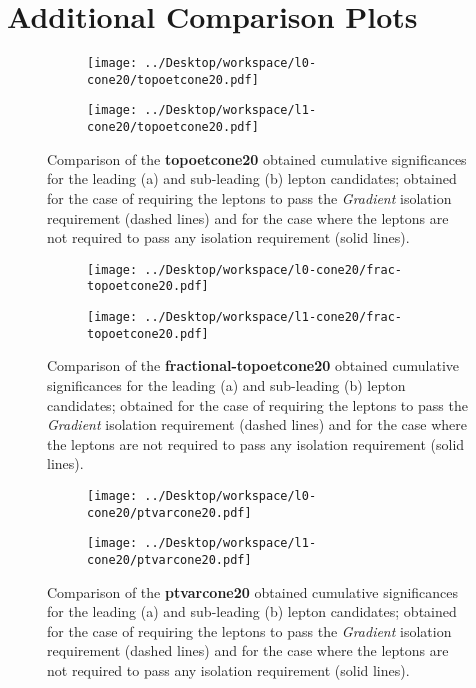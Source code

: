 \chapter{Additional Comparison Plots}
\label{appendix3}
\begin{figure}
\centering
\begin{subfigure}{.85\textwidth}
  \centering
  \texttt{[image: ../Desktop/workspace/l0-cone20/topoetcone20.pdf]}
  \caption{}
  \label{leading_topoetcone}
\end{subfigure}
\begin{subfigure}{.85\textwidth}
  \centering
  \texttt{[image: ../Desktop/workspace/l1-cone20/topoetcone20.pdf]}
  \caption{}
  \label{subleading_topoetcone}
\end{subfigure}
\caption{Comparison of the \textbf{topoetcone20} obtained cumulative significances for the leading (a) and sub-leading (b) lepton candidates; obtained for the case of requiring the leptons to pass the \textit{Gradient} isolation requirement (dashed lines) and for the case where the leptons are not required to pass any isolation requirement (solid lines).}
\label{comp_topoetcone}
\end{figure}
\begin{figure}
\centering
\begin{subfigure}{.85\textwidth}
  \centering
  \texttt{[image: ../Desktop/workspace/l0-cone20/frac-topoetcone20.pdf]}
  \caption{}
  \label{leading_frac-topoetcone}
\end{subfigure}
\begin{subfigure}{.85\textwidth}
  \centering
  \texttt{[image: ../Desktop/workspace/l1-cone20/frac-topoetcone20.pdf]}
  \caption{}
  \label{subleading_frac-topoetcone}
\end{subfigure}
\caption{Comparison of the \textbf{fractional-topoetcone20} obtained cumulative significances for the leading (a) and sub-leading (b) lepton candidates; obtained for the case of requiring the leptons to pass the \textit{Gradient} isolation requirement (dashed lines) and for the case where the leptons are not required to pass any isolation requirement (solid lines).}
\label{comp_frac-topoetcone}
\end{figure}
\begin{figure}
\centering
\begin{subfigure}{.85\textwidth}
  \centering
  \texttt{[image: ../Desktop/workspace/l0-cone20/ptvarcone20.pdf]}
  \caption{}
  \label{leading_ptvarcone}
\end{subfigure}
\begin{subfigure}{.85\textwidth}
  \centering
  \texttt{[image: ../Desktop/workspace/l1-cone20/ptvarcone20.pdf]}
  \caption{}
  \label{subleading_ptvarcone}
\end{subfigure}
\caption{Comparison of the \textbf{ptvarcone20} obtained cumulative significances for the leading (a) and sub-leading (b) lepton candidates; obtained for the case of requiring the leptons to pass the \textit{Gradient} isolation requirement (dashed lines) and for the case where the leptons are not required to pass any isolation requirement (solid lines).}
\label{comp_ptvarcone}
\end{figure}
